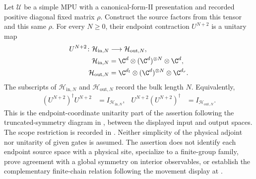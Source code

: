 \begin{lemma}
    \label{thm:mpug_truncated_symmetry_unitary}
    \leanok
    Let $\mathcal U$ be a simple MPU with a canonical-form-II presentation
    and recorded positive diagonal fixed matrix $\rho$. Construct the
    source factors from this tensor and this same $\rho$. For every
    $N\geq0$, their endpoint contraction $U^{N+2}$ is a unitary map
    \begin{align}
        U^{N+2}\colon\mathcal H_{\mathrm{in},N}
         & \longrightarrow\mathcal H_{\mathrm{out},N},        \\
        \mathcal H_{\mathrm{in},N}
         & =\C^d\otimes(\C^d)^{\otimes N}\otimes\C^d,         \\
        \mathcal H_{\mathrm{out},N}
         & =\C^{d_l}\otimes(\C^d)^{\otimes N}\otimes\C^{d_r}.
        \label{eq:mpug_truncated_symmetry_unitary_spaces}
    \end{align}
    The subscripts of $\mathcal H_{\mathrm{in},N}$ and
    $\mathcal H_{\mathrm{out},N}$ record the bulk length $N$. Equivalently,
    \begin{align}
        (U^{N+2})^\dagger U^{N+2} & =I_{\mathcal H_{\mathrm{in},N}},  &
        U^{N+2}(U^{N+2})^\dagger  & =I_{\mathcal H_{\mathrm{out},N}}.
        \label{eq:mpug_truncated_symmetry_unitary}
    \end{align}
    This is the endpoint-coordinate unitarity part of the assertion
    following the truncated-symmetry diagram in
    \cite[lines~2062--2099]{FrancoRubio2025MPUGauging}, between the
    displayed input and output spaces. The scope restriction is recorded
    in \cite{gap:fbc25_truncated_symmetry_endpoint_unitarity_scope}.
    Neither simplicity of the physical adjoint nor unitarity of given
    gates is assumed. The assertion does not identify each endpoint
    source space with a physical site, specialize to a finite-group
    family, prove agreement with a global symmetry on interior
    observables, or establish the complementary finite-chain relation
    following the movement display at
    \cite[lines~2101--2174]{FrancoRubio2025MPUGauging}.
\end{lemma}
